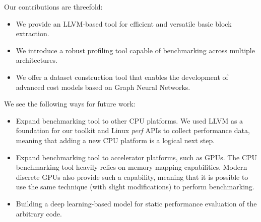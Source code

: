 Our contributions are threefold:
\begin{itemize}
    \item We provide an LLVM-based tool for efficient and versatile basic block extraction.
    \item We introduce a robust profiling tool capable of benchmarking across multiple architectures.
    \item We offer a dataset construction tool that enables the development of advanced cost models based on Graph Neural Networks.
\end{itemize}

We see the following ways for future work:
\begin{itemize}
  \item Expand benchmarking tool to other CPU platforms. We used LLVM as a foundation for our 
    toolkit and Linux \textit{perf} APIs to collect performance data, meaning that adding a new CPU
        platform is a logical next step.
  \item Expand benchmarking tool to accelerator platforms, such as GPUs. The CPU benchmarking tool
        heavily relies on memory mapping capabilities. Modern discrete GPUs also provide such a capability,
        meaning that it is possible to use the same technique (with slight modifications) to perform benchmarking.
  \item Building a deep learning-based model for static performance evaluation of the arbitrary code.
\end{itemize}
